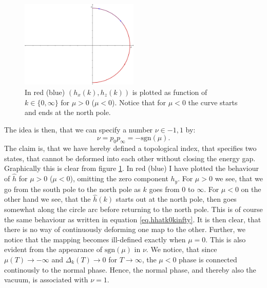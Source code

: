 \begin{figure} 
\begin{center}  
\includegraphics[width=0.5\textwidth]{Figures/Topologicalindex/topindex}  
\caption{In red (blue) $(h_x(k),h_z(k))$ is plotted as function of $k\in \{0, \infty\}$ for $\mu > 0$ ($\mu < 0$). Notice that for $\mu < 0$ the curve starts and ends at the north pole.}  
\label{fig.hhatplot}  
\end{center}    
\end{figure}


The idea is then, that we can specify a number $\nu \in {-1,1}$ by:
\begin{equation}
\nu = p_0p_{\infty} = -\text{sgn}(\mu).
\label{eq.topinvnudefition}
\end{equation}
The claim is, that we have hereby defined a topological index, that specifies two states, that cannot be deformed into each other without closing the energy gap. Graphically this is clear from figure \ref{fig.hhatplot}. In red (blue) I have plotted the behaviour of $\hat{h}$ for $\mu > 0$ ($\mu < 0$), omitting the zero component $h_y$. For $\mu > 0$ we see, that we go from the south pole to the north pole as $k$ goes from $0$ to $\infty$. For $\mu < 0$ on the other hand we see, that the $\hat{h}(k)$ starts out at the north pole, then goes somewhat along the circle arc before returning to the north pole. This is of course the same behaviour as written in equation \eqref{eq.hhatk0kinfty}. It is then clear, that there is no way of continuously deforming one map to the other. Further, we notice that the mapping becomes ill-defined exactly when $\mu = 0$. This is also evident from the appearance of $\text{sgn}(\mu)$ in $\nu$. We notice, that since $\mu(T) \to -\infty$ and $\Delta_k(T)\to 0$ for $T\to \infty$, the $\mu < 0$ phase is connected continously to the normal phase. Hence, the normal phase, and thereby also the vacuum, is associated with $\nu = 1$. 

